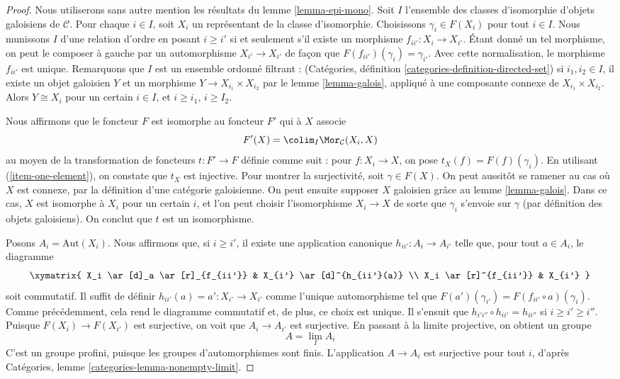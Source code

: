 \begin{proof}
Nous utiliserons sans autre mention les résultats du lemme \ref{lemma-epi-mono}.
Soit $I$ l'ensemble des classes d'isomorphie d'objets galoisiens de $\mathcal{C}$.
Pour chaque $i \in I$, soit $X_i$ un représentant de la classe d'isomorphie.
Choisissons $\gamma_i \in F(X_i)$ pour tout $i \in I$.
Nous munissons $I$ d'une relation d'ordre en posant $i \geq i'$ si
et seulement s'il existe un morphisme $f_{ii'} : X_i \to X_{i'}$.
Étant donné un tel morphisme, on peut le composer à gauche par un automorphisme
$X_{i'} \to X_{i'}$ de façon que $F(f_{ii'})(\gamma_i) = \gamma_{i'}$.
Avec cette normalisation, le morphisme $f_{ii'}$ est unique.
Remarquons que $I$ est un ensemble ordonné filtrant :
(Catégories, définition \ref{categories-definition-directed-set})
si $i_1, i_2 \in I$, il existe un objet galoisien $Y$ et un morphisme
$Y \to X_{i_1} \times X_{i_2}$ par le lemme \ref{lemma-galois}, appliqué
à une composante connexe de $X_{i_1} \times X_{i_2}$.
Alors $Y \cong X_i$ pour un certain $i \in I$, et $i \geq i_1$, $i \geq I_2$.

\medskip\noindent
Nous affirmons que le foncteur $F$ est isomorphe au foncteur $F'$
qui à $X$ associe
$$
F'(X) = \colim_I \Mor_\mathcal{C}(X_i, X)
$$
au moyen de la transformation de foncteurs $t : F' \to F$ définie comme suit :
pour $f : X_i \to X$, on pose $t_X(f) = F(f)(\gamma_i)$.
En utilisant (\ref{item-one-element}), on constate que $t_X$ est injective.
Pour montrer la surjectivité, soit $\gamma \in F(X)$. On peut aussitôt
se ramener au cas où $X$ est connexe, par la définition d'une
catégorie galoisienne. On peut ensuite supposer $X$ galoisien grâce au
lemme \ref{lemma-galois}. Dans ce cas, $X$ est isomorphe à $X_i$
pour un certain $i$, et l'on peut choisir l'isomorphisme $X_i \to X$ de sorte
que $\gamma_i$ s'envoie sur $\gamma$ (par définition des objets galoisiens).
On conclut que $t$ est un isomorphisme.

\medskip\noindent
Posons $A_i = \text{Aut}(X_i)$.
Nous affirmons que, si $i \geq i'$, il existe une application canonique
$h_{ii'} : A_i \to A_{i'}$ telle que, pour tout $a \in A_i$,
le diagramme
$$
\xymatrix{
X_i \ar[d]_a \ar[r]_{f_{ii'}} & X_{i'} \ar[d]^{h_{ii'}(a)} \\
X_i \ar[r]^{f_{ii'}} & X_{i'}
}
$$
soit commutatif. Il suffit de définir $h_{ii'}(a) = a' : X_{i'} \to X_{i'}$
comme l'unique automorphisme tel que
$F(a')(\gamma_{i'}) = F(f_{ii'} \circ a)(\gamma_i)$.
Comme précédemment, cela rend le diagramme commutatif et, de plus, ce choix
est unique.
Il s'ensuit que
$h_{i'i''} \circ h_{ii'} = h_{ii''}$
si $i \geq i' \geq i''$.
Puisque $F(X_i) \to F(X_{i'})$ est surjective, on voit que
$A_i \to A_{i'}$ est surjective.
En passant à la limite projective, on obtient un groupe
$$
A = \lim_I A_i
$$
C'est un groupe profini, puisque les groupes d'automorphismes sont finis.
L'application $A \to A_i$ est surjective pour tout $i$, d'après
Catégories, lemme \ref{categories-lemma-nonempty-limit}.


\end{proof}
